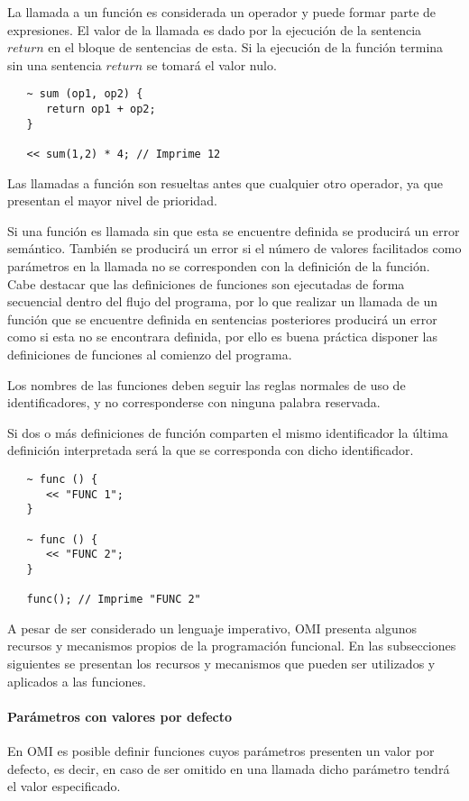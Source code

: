 La llamada a un función es considerada un operador y puede formar parte de expresiones. El
valor de la llamada es dado por la ejecución de la sentencia $return$ en el bloque de sentencias
de esta. Si la ejecución de la función termina sin una sentencia $return$ se tomará el valor nulo. \\

\begin{lstlisting}
   ~ sum (op1, op2) { 
      return op1 + op2;
   }
   
   << sum(1,2) * 4; // Imprime 12
\end{lstlisting} 

Las llamadas a función son resueltas antes que cualquier otro operador, ya que presentan el mayor nivel de prioridad. 

Si una función es llamada sin que esta se encuentre definida se producirá un error semántico. También se producirá 
un error si el número de valores facilitados como parámetros en la llamada no se corresponden con la definición de la función. Cabe destacar 
que las definiciones de funciones son ejecutadas de forma secuencial dentro del flujo del programa, por lo que realizar 
un llamada de un función que se encuentre definida en sentencias posteriores producirá un error como si esta no
se encontrara definida, por ello es buena práctica disponer las definiciones de funciones al comienzo del programa.

Los nombres de las funciones deben seguir las reglas normales de uso de identificadores, y no corresponderse con ninguna
palabra reservada.

Si dos o más definiciones de función comparten el mismo identificador la última definición interpretada será la que se corresponda
con dicho identificador. \\

\begin{lstlisting}
   ~ func () { 
      << "FUNC 1";
   }
   
   ~ func () { 
      << "FUNC 2";
   }
   
   func(); // Imprime "FUNC 2"
\end{lstlisting} 

A pesar de ser considerado un lenguaje imperativo, OMI presenta algunos recursos y mecanismos propios de la programación funcional. En las 
subsecciones siguientes se presentan los recursos y mecanismos que pueden ser utilizados y aplicados a las funciones. 

\paragraph{Parámetros con valores por defecto}
En OMI es posible definir funciones cuyos parámetros presenten un valor por defecto, es decir, en caso de ser omitido en una llamada
dicho parámetro tendrá el valor especificado. 

